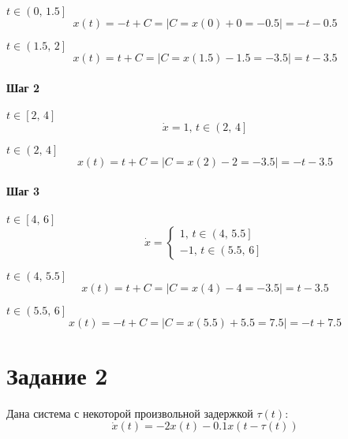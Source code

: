     $t \in \left( 0,\,1.5 \right]$
    \begin{equation}
        x(t) = -t + C = \left| C = x(0) + 0 = -0.5\right| = -t - 0.5
    \end{equation}

    $t \in \left( 1.5,\,2 \right]$
    \begin{equation}
        x(t) = t + C = \left| C = x(1.5) - 1.5 = -3.5\right| = t - 3.5
    \end{equation}

    \paragraph*{Шаг 2} $t \in \left[ 2,\,4 \right]$
    \\
    \begin{equation}
        \dot{x} = 1,\,t \in \left( 2,\,4 \right]
    \end{equation}

    $t \in \left( 2,\,4 \right]$
    \begin{equation}
        x(t) = t + C = \left| C = x(2) - 2 = -3.5\right| = -t - 3.5
    \end{equation}

    \paragraph*{Шаг 3} $t \in \left[ 4,\,6 \right]$
    \\
    \begin{equation}
        \dot{x} =
        \left\{
        \begin{aligned}
            1,\,t \in \left( 4,\,5.5 \right]\\
            -1,\,t \in \left( 5.5,\,6 \right]
        \end{aligned}
        \right.
    \end{equation}

    $t \in \left( 4,\,5.5 \right]$
    \begin{equation}
        x(t) = t + C = \left| C = x(4) - 4 = -3.5\right| = t - 3.5
    \end{equation}

    $t \in \left( 5.5,\,6 \right]$
    \begin{equation}
        x(t) = -t + C = \left| C = x(5.5) + 5.5 = 7.5\right| = -t + 7.5
    \end{equation}

    \section*{Задание 2}
    Дана система с некоторой произвольной задержкой $\tau(t)$:
    \begin{equation}
        \label{z2_sys}
        \dot{x}(t) = -2x(t) - 0.1x(t- \tau(t))
    \end{equation}

